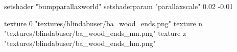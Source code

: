 	setshader "bumpparallaxworld"
	setshaderparam "parallaxscale" 0.02 -0.01

    texture 0 "textures/blindabuser/ba_wood_ends.png"
    texture n "textures/blindabuser/ba_wood_ends_nm.png"
    texture z "textures/blindabuser/ba_wood_ends_hm.png"
